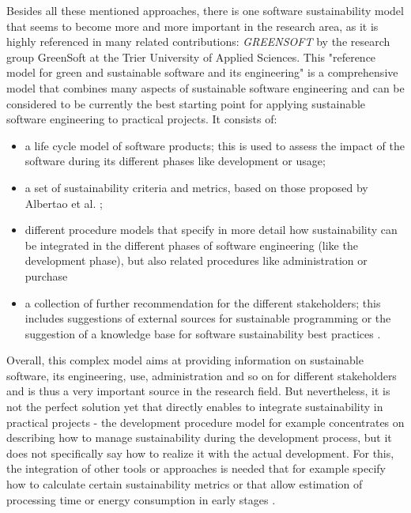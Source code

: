 \documentclass[oribibl]{llncs}
\begin{document}
Besides all these mentioned approaches, there is one software sustainability model that seems to become more and more important in the research area, as it is highly referenced in many related contributions: \textit{GREENSOFT} \cite{naumann_greensoft_2011} by the research group GreenSoft at the Trier University of Applied Sciences. This "reference model for green and sustainable software and its engineering" \cite{naumann_greensoft_2011} is a comprehensive model that combines many aspects of sustainable software engineering %
and can be considered to be currently the best starting point for applying sustainable software engineering to practical projects. It consists of:
\begin{itemize}
	\item a life cycle model of software products; this is used to assess the impact of the software during its different phases like development or usage; \cite{naumann_greensoft_2011}
	\item a set of sustainability criteria and metrics, based on those proposed by Albertao et al. \cite{albertao_measuring_2010}; \cite{naumann_greensoft_2011}
	\item different procedure models that specify in more detail how sustainability can be integrated in the different phases of software engineering (like the development phase), but also related procedures like administration or purchase \cite{naumann_greensoft_2011}
	\item a collection of further recommendation for the different stakeholders; this includes suggestions of external sources for sustainable programming or the suggestion of a knowledge base for software sustainability best practices \cite{naumann_greensoft_2011}.
\end{itemize} %
Overall, this complex model aims at providing information on sustainable software, its engineering, use, administration and so on for different stakeholders and is thus a very important source in the research field. But nevertheless, it is not the perfect solution yet that directly enables to integrate sustainability in practical projects - the development procedure model for example concentrates on describing how to manage sustainability %
during the development process, %
but it does not specifically say how to realize it with the actual development. For this, the integration of other tools or approaches is needed that for example specify how to calculate certain sustainability metrics or that allow estimation of processing time or energy consumption in early stages \cite{naumann_greensoft_2011} %
.
\end{document}
